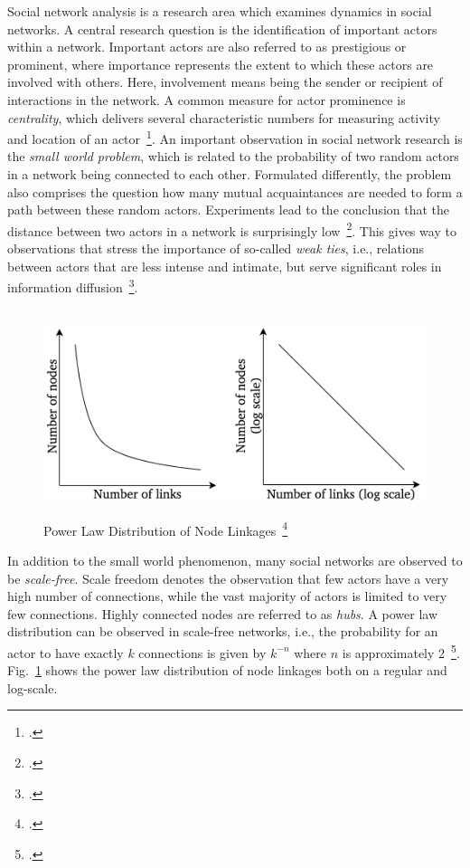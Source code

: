 Social network analysis is a research area which examines dynamics in social
networks.
A central research question is the identification of important actors within
a network.
Important actors are also referred to as prestigious or prominent, where importance
represents the extent to which these actors are involved with others.
Here, involvement means being the sender or recipient of interactions in the
network.
A common measure for actor prominence is \textit{centrality}, which delivers
several characteristic numbers for measuring activity and location of an actor~\footcite{Wasserman1994}.
An important observation in social network research is the \textit{small world problem},
which is related to the probability of two random actors in a network being
connected to each other.
Formulated differently, the problem also comprises the question how many
mutual acquaintances are needed to form a path between these random actors.
Experiments lead to the conclusion that the distance between two actors in
a network is surprisingly low~\footcite{Travers1969}.
This gives way to observations that stress the importance of so-called
\textit{weak ties}, i.e., relations between actors that are less intense and
intimate, but serve significant roles in information diffusion~\footcite{Granovetter1973}.

\begin{figure}[h]
  \includegraphics[height=6cm]{img/power_law_linkages}
  \caption[Power Law Distribution of Node Linkages]{Power Law Distribution of Node Linkages~\footcite{Barabasi2003}}
\label{fig:power_law}
\end{figure}

In addition to the small world phenomenon, many social networks are observed to
be \textit{scale-free}.
Scale freedom denotes the observation that few actors have a very high number of connections,
while the vast majority of actors is limited to very few connections.
Highly connected nodes are referred to as \textit{hubs}.
A power law distribution can be observed in scale-free networks, i.e., the
probability for an actor to have exactly $k$ connections is given by $k^{-n}$
where $n$ is approximately 2~\footcite{Barabasi2003}.
Fig.~\ref{fig:power_law} shows the power law distribution of node linkages both
on a regular and log-scale.

